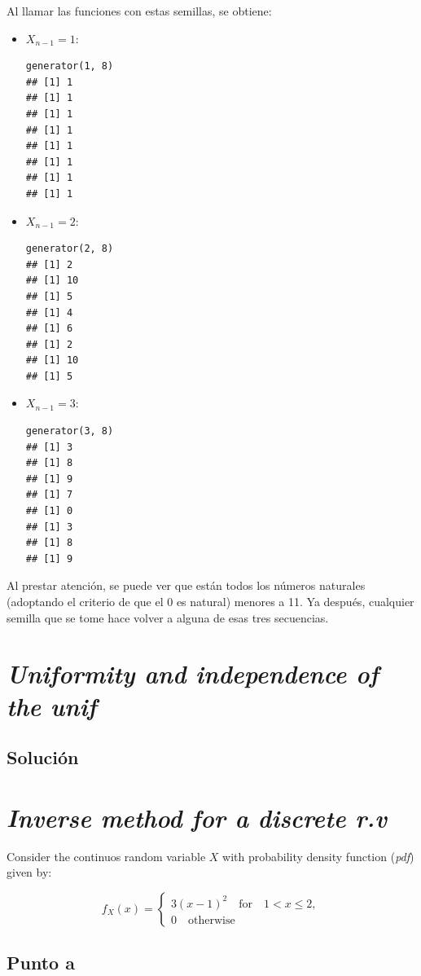 \documentclass[12pt]{article}
\begin{document}
Al llamar las funciones con estas semillas, se obtiene:

\begin{itemize}
  \item $X_{n-1} = 1:$
\begin{lstlisting}
generator(1, 8)
## [1] 1
## [1] 1
## [1] 1
## [1] 1
## [1] 1
## [1] 1
## [1] 1
## [1] 1
\end{lstlisting}
  \item $X_{n-1} = 2:$
\begin{lstlisting}
generator(2, 8)
## [1] 2
## [1] 10
## [1] 5
## [1] 4
## [1] 6
## [1] 2
## [1] 10
## [1] 5
\end{lstlisting}
  \item $X_{n-1} = 3:$
\begin{lstlisting}
generator(3, 8)
## [1] 3
## [1] 8
## [1] 9
## [1] 7
## [1] 0
## [1] 3
## [1] 8
## [1] 9
\end{lstlisting}
\end{itemize}

Al prestar atención, se puede ver que están todos los números naturales (adoptando el criterio de que el 0 es natural) menores a 11. Ya después, cualquier semilla que se tome hace volver a alguna de esas tres secuencias.


\section{\textit{Uniformity and independence of the unif}}
\subsection{Solución}

\section{\textit{Inverse method for a discrete r.v}}

Consider the continuos random variable $X$ with probability density function (\textit{pdf}) given by:

\[
f_{X} (x) =
\begin{cases}
  3(x - 1)^{2} \quad \text{for} \quad 1 < x \leq 2, \\
  0 \quad \text{otherwise}
\end{cases}
\]


\subsection{Punto a}
\end{document}
